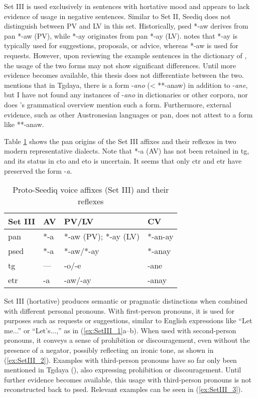 Set III is used exclusively in sentences with hortative mood and appears to lack evidence of usage in negative sentences. Similar to Set II, Seediq does not distinguish between PV and LV in this set. Historically, \acl{psed} *-aw derives from \acl{pan} *-aw (PV), while *-ay originates from \acl{pan} *-ay (LV). \textcite[103]{Lee2018Trugrammar} notes that *-ay is typically used for suggestions, proposals, or advice, whereas *-aw is used for requests. However, upon reviewing the example sentences in the dictionary of \textcite{ILRDFEdict}, the usage of the two forms may not show significant differences. Until more evidence becomes available, this thesis does not differentiate between the two. \textcite[97]{Sung2018Sedgrammar} mentions that in Tgdaya, there is a form -\textit{ano} (< **-anaw) in addition to -\textit{ane}, but I have not found any instances of -\textit{ano} in dictionaries or other corpora, nor does \citeauthor{ochiai2016phd}'s \citeyear{ochiai2016phd} grammatical overview mention such a form. Furthermore, external evidence, such as other Austronesian languages or \acl{pan}, does not attest to a form like **-anaw.

Table \ref{tab:psed_voi_III} shows the \acl{pan} origins of the Set III affixes and their reflexes in two modern representative dialects. Note that *-a (AV) has not been retained in \acl{tg}, and its status in \acl{cto} and \acl{eto} is uncertain. It seems that only \acl{ctr} and \acl{etr} have preserved the form -\textit{a}.

\begin{table}[!htbp]
\centering
\caption{Proto-Seediq voice affixes (Set III) and their reflexes}
\label{tab:psed_voi_III}
\begin{tabular}{llll}
\hline
Set III   & AV  & PV/LV                & CV      \\ \hline
\ac{pan}  & *-a & *-aw (PV); *-ay (LV) & *-an-ay \\
\ac{psed} & *-a & *-aw/*-ay            & *-anay  \\
\ac{tg}   & --- & -o/-e                & -ane    \\
\ac{etr}  & -a  & -aw/-ay              & -anay   \\ \hline
\end{tabular}
\end{table}

Set III (hortative) produces semantic or pragmatic distinctions when combined with different personal pronouns. With first-person pronouns, it is used for purposes such as requests or suggestions, similar to English expressions like ``Let me...'' or ``Let's...,'' as in (\ref{ex:SetIII_1}a--b). When used with second-person pronouns, it conveys a sense of prohibition or discouragement, even without the presence of a negator, possibly reflecting an ironic tone, as shown in (\ref{ex:SetIII_2}). Examples with third-person pronouns have so far only been mentioned in Tgdaya (\cite[97--98]{ochiai2016phd}), also expressing prohibition or discouragement. Until further evidence becomes available, this usage with third-person pronouns is not reconstructed back to \acl{psed}. Relevant examples can be seen in (\ref{ex:SetIII_3}).


